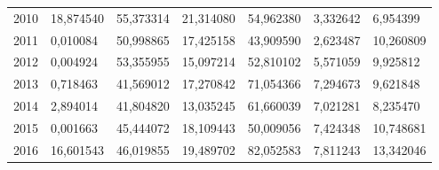\begin{table}
\begin{tabular}{p{1cm}p{2cm}p{2cm}p{2cm}p{2cm}p{2cm}p{2cm}}
 2010 &                        18,874540 &                       55,373314 &                                    21,314080 &  54,962380 & 3,332642 &                            6,954399 \\
 2011 &                         0,010084 &                       50,998865 &                                    17,425158 &  43,909590 & 2,623487 &                           10,260809 \\
 2012 &                         0,004924 &                       53,355955 &                                    15,097214 &  52,810102 & 5,571059 &                            9,925812 \\
 2013 &                         0,718463 &                       41,569012 &                                    17,270842 &  71,054366 & 7,294673 &                            9,621848 \\
 2014 &                         2,894014 &                       41,804820 &                                    13,035245 &  61,660039 & 7,021281 &                            8,235470 \\
 2015 &                         0,001663 &                       45,444072 &                                    18,109443 &  50,009056 & 7,424348 &                           10,748681 \\
 2016 &                        16,601543 &                       46,019855 &                                    19,489702 &  82,052583 & 7,811243 &                           13,342046 \\
\bottomrule
\end{tabular}
\end{table}

